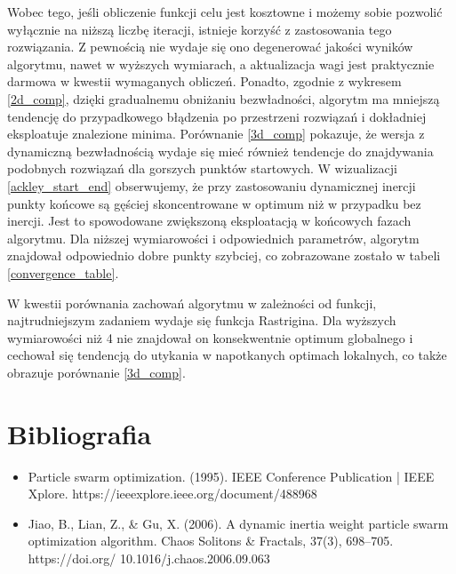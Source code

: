 \documentclass[12pt]{article}
\begin{document}
Wobec tego, jeśli obliczenie funkcji celu jest kosztowne i możemy sobie pozwolić wyłącznie na niższą liczbę iteracji, istnieje korzyść z zastosowania tego rozwiązania.
Z pewnością nie wydaje się ono degenerować jakości wyników algorytmu, nawet w wyższych wymiarach, a aktualizacja wagi jest praktycznie darmowa w kwestii wymaganych obliczeń.
Ponadto, zgodnie z wykresem \ref{2d_comp}, dzięki gradualnemu obniżaniu bezwładności, algorytm ma mniejszą tendencję do przypadkowego błądzenia po przestrzeni rozwiązań i
dokładniej eksploatuje znalezione minima. Porównanie \ref{3d_comp} pokazuje, że wersja z dynamiczną bezwładnością wydaje się mieć również tendencje do znajdywania podobnych
rozwiązań dla gorszych punktów startowych. W wizualizacji \ref{ackley_start_end} obserwujemy, że przy zastosowaniu dynamicznej inercji punkty końcowe są gęściej skoncentrowane
w optimum niż w przypadku bez inercji. Jest to spowodowane zwiększoną eksploatacją w końcowych fazach algorytmu. Dla niższej wymiarowości i odpowiednich parametrów, algorytm znajdował
odpowiednio dobre punkty szybciej, co zobrazowane zostało w tabeli \ref{convergence_table}.

W kwestii porównania zachowań algorytmu w zależności od funkcji, najtrudniejszym zadaniem wydaje się funkcja Rastrigina. Dla wyższych wymiarowości niż 4 nie znajdował on
konsekwentnie optimum globalnego i cechował się tendencją do utykania w napotkanych optimach lokalnych, co także obrazuje porównanie \ref{3d_comp}.

\section{Bibliografia}
\begin{itemize}
	\item{Particle swarm optimization. (1995). IEEE Conference Publication | IEEE Xplore. https://ieeexplore.ieee.org/document/488968}
	\item{Jiao, B., Lian, Z., \& Gu, X. (2006). A dynamic inertia weight particle swarm optimization algorithm. Chaos Solitons \& Fractals, 37(3), 698–705. https://doi.org/ 10.1016/j.chaos.2006.09.063}
\end{itemize}
\end{document}
